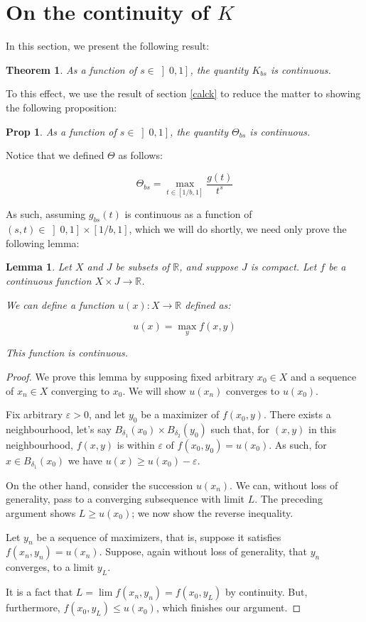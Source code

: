 \documentclass[11pt]{amsart}
\newcommand{\R}{\mathbb{R}}
\newtheorem{lemma}{Lemma}
\newtheorem{theorem}{Theorem}
\newtheorem{prop}{Prop}
\begin{document}
\section{On the continuity of $K$}

In this section, we present the following result:

\begin{theorem}
As a function of $s \in \left]0, 1\right]$, the quantity $K_{bs}$ is continuous.
\end{theorem}

To this effect, we use the result of section \ref{calck} to reduce the matter to showing the following proposition:

\begin{prop}
As a function of $s \in \left]0, 1\right]$, the quantity $\Theta_{bs}$ is continuous.
\end{prop}

Notice that we defined $\Theta$ as follows:

\[ \Theta_{bs} = \max_{t \in \left[ 1/b, 1 \right]} \frac{g(t)}{t^s} \]

As such, assuming $g_{bs}(t)$ is continuous as a function of $(s, t) \in \left]0, 1\right] \times \left[1/b, 1\right]$, which we will do shortly, we need only prove the following lemma:

\begin{lemma}
Let $X$ and $J$ be subsets of $\R$, and suppose $J$ is compact. Let $f$ be a continuous function $X \times J \to \R$.

We can define a function $u(x) : X \to \R$ defined as:

\[ u(x) = \max_y f(x,y) \]

This function is continuous.
\end{lemma}

\begin{proof}
We prove this lemma by supposing fixed arbitrary $x_0 \in X$ and a sequence of $x_n \in X$ converging to $x_0$. We will show $u(x_n)$ converges to $u(x_0)$.

Fix arbitrary $\varepsilon > 0$, and let $y_0$ be a maximizer of $f(x_0, y)$. There exists a neighbourhood, let's say $B_{\delta_1}(x_0) \times B_{\delta_2}(y_0)$ such that, for $(x,y)$ in this neighbourhood, $f(x,y)$ is within $\varepsilon$ of $f(x_0, y_0) = u(x_0)$. As such, for $x \in B_{\delta_1}(x_0)$ we have $u(x) \geq u(x_0) - \varepsilon$.

On the other hand, consider the succession $u(x_n)$. We can, without loss of generality, pass to a converging subsequence with limit $L$. The preceding argument shows $L \geq u(x_0)$; we now show the reverse inequality.

Let $y_n$ be a sequence of maximizers, that is, suppose it satisfies $f(x_n, y_n) = u(x_n)$. Suppose, again without loss of generality, that $y_n$ converges, to a limit $y_L$.

It is a fact that $L = \lim f(x_n, y_n) = f(x_0, y_L)$ by continuity. But, furthermore, $f(x_0, y_L) \leq u(x_0)$, which finishes our argument.
\end{proof}
\end{document}
